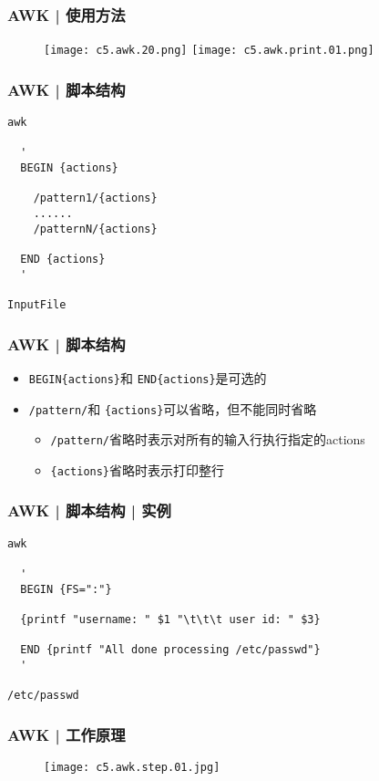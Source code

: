 \begin{frame}[fragile]
  \frametitle{AWK | 使用方法}
  \begin{figure}
    \centering
    \texttt{[image: c5.awk.20.png]}
    \vspace{0.5cm}
    \texttt{[image: c5.awk.print.01.png]}
  \end{figure}
\end{frame}

\begin{frame}[fragile]
  \frametitle{AWK | \alert{脚本结构}}
\begin{lstlisting}
awk

  '
  BEGIN {actions}

    /pattern1/{actions}
    ......
    /patternN/{actions}

  END {actions}
  '

InputFile
\end{lstlisting}
\end{frame}

\begin{frame}[fragile]
  \frametitle{AWK | 脚本结构}
  \begin{itemize}
    \item \verb|BEGIN{actions}|和 \verb|END{actions}|是可选的
    \item \verb|/pattern/|和 \verb|{actions}|可以省略，但不能同时省略
      \begin{itemize}
        \item \verb|/pattern/|省略时表示对所有的输入行执行指定的actions
        \item \verb|{actions}|省略时表示打印整行
      \end{itemize}
  \end{itemize}
\end{frame}

\begin{frame}[fragile,label=example]
  \frametitle{AWK | 脚本结构 | 实例}
\begin{lstlisting}
awk

  '
  BEGIN {FS=":"}

  {printf "username: " $1 "\t\t\t user id: " $3}

  END {printf "All done processing /etc/passwd"}
  '

/etc/passwd
\end{lstlisting}
\end{frame}


\begin{frame}
  \frametitle{AWK | \alert{工作原理}}
  \begin{figure}
    \centering
    \texttt{[image: c5.awk.step.01.jpg]}
  \end{figure}
\end{frame}

